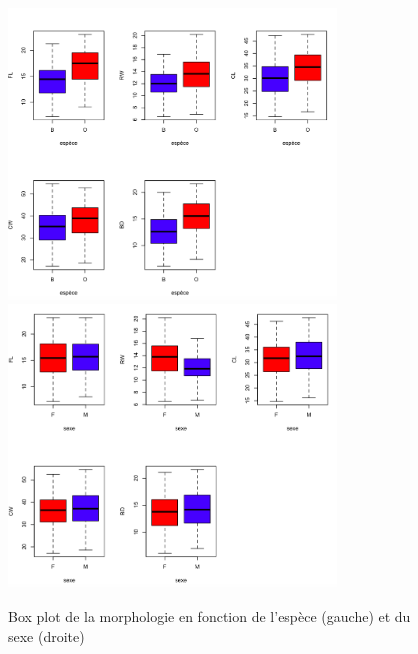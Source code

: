\documentclass{article}
\begin{document}
\begin{figure}[!ht]
\centering
\includegraphics[width=8.7cm]{./img/box_plot_sex.png}%
\includegraphics[width=8.7cm]{./img/box_plot_sp.png}
\caption{Box plot de la morphologie en fonction de l'espèce (gauche) et du sexe (droite)}
\label{fig:sp_sex_morphologique}
\end{figure}
\end{document}
